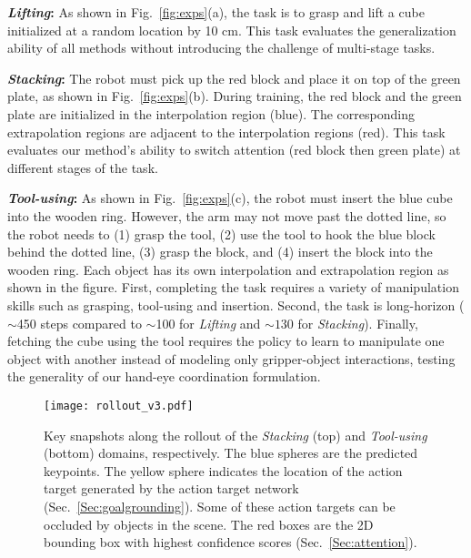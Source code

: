 \documentclass[letterpaper, 10 pt, conference]{ieeeconf}
\begin{document}
\textbf{\emph{Lifting}:} As shown in Fig.~\ref{fig:exps}(a), the task is to grasp and lift a cube initialized at a random location by 10 cm. This task evaluates the generalization ability of all methods without introducing the challenge of multi-stage tasks.

\textbf{\emph{Stacking}:} The robot must pick up the red block and place it on top of the green plate, as shown in Fig.~\ref{fig:exps}(b). During training, the red block and the green plate are initialized in the interpolation region (blue). The corresponding extrapolation regions are adjacent to the interpolation regions (red). This task evaluates our method's ability to switch attention (red block then green plate) at different stages of the task.

\textbf{\emph{Tool-using}:} As shown in Fig.~\ref{fig:exps}(c), the robot must insert the blue cube into the wooden ring. However, the arm may not move past the dotted line, so the robot needs to  (1) grasp the tool, (2) use the tool to hook the blue block behind the dotted line, (3) grasp the block, and (4) insert the block into the wooden ring. Each object has its own interpolation and extrapolation region as shown in the figure. First, completing the task requires a variety of manipulation skills such as grasping, tool-using and insertion. Second, the task is long-horizon ($\sim$450 steps compared to $\sim$100 for \emph{Lifting} and $\sim 130$ for \emph{Stacking}). Finally, fetching the cube using the tool requires the policy to learn to manipulate one object with another instead of modeling only gripper-object interactions, testing the generality of our hand-eye coordination formulation.

\begin{figure*}[t]
	\centering
    \texttt{[image: rollout\_v3.pdf]}
	\caption{Key snapshots along the rollout of the \emph{Stacking} (top) and \emph{Tool-using} (bottom) domains, respectively. The blue spheres are the predicted keypoints. The yellow sphere indicates the location of the action target generated by the action target network (Sec.~\ref{Sec:goalgrounding}). Some of these action targets can be occluded by objects in the scene. The red boxes are the 2D bounding box with highest confidence scores (Sec.~\ref{Sec:attention}).}
	\label{fig:rollout}
	    \vspace{-5pt}
\end{figure*}
\end{document}
